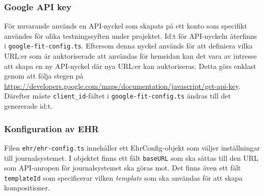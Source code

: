 \documentclass[techdoc/techdoc.tex]{subfiles}
\begin{document}
\subsubsection{Google API key}
För nuvarande används en API-nyckel som skapats på ett konto som specifikt
användes för olika testningssyften under projektet. Id:t för API-nyckeln
återfinns i \texttt{google-fit-config.ts}. Eftersom denna nyckel används för
att definiera vilka URL:er som är auktoriserade att användas för hemsidan kan
det vara av intresse att skapa en ny API-nyckel där nya URL:er kan
auktoriseras. Detta görs enklast genom att följa stegen på
\url{https://developers.google.com/maps/documentation/javascript/get-api-key}.
Därefter måste \texttt{client\_id}-fältet i \texttt{google-fit-config.ts}
ändras till det genererade id:t.

\subsubsection{Konfiguration av EHR}
Filen \texttt{ehr/ehr-config.ts} innehåller ett EhrConfig-objekt som väljer
inställningar till journalsystemet. I objektet finns ett fält \texttt{baseURL}
som ska sättas till den URL som API-anropen för journalsystemet ska göras mot.
Det finns även ett fält \texttt{templateId} som specificerar vilken
\emph{template} som ska användas för att skapa kompositioner.
\end{document}
